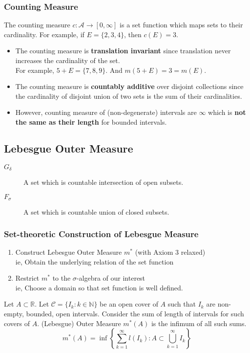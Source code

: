 \subsubsection{Counting Measure}
	The counting measure $c : \mathcal{A} \to [0,\infty]$ is a set function which maps sets to their cardinality.
	For example, if $E = \{2,3,4\}$, then $c(E) = 3$.
\begin{itemize}
	\item The counting measure is \textbf{translation invariant} since translation never increases the cardinality of the set.\\
	For example, $5+E = \{7,8,9\}$.
	And $m(5+E) = 3 = m(E)$.
	\item The counting measure is \textbf{countably additive} over disjoint collections since the cardinality of disjoint union of two sets is the sum of their cardinalities.
	\item However, counting measure of (non-degenerate) intervals are $\infty$ which is \textbf{not the same as their length} for bounded intervals.
\end{itemize}

\subsection{Lebesgue Outer Measure}
\begin{description}
	\item[$G_\delta$] A set which is countable intersection of open subsets.
	\item[$F_\sigma$] A set which is countable union of closed subsets.
\end{description}

\subsubsection{Set-theoretic Construction of Lebesgue Measure}
\begin{enumerate}
	\item Construct Lebesgue Outer Measure $m^\ast$ (with Axiom 3 relaxed) \\
		ie, Obtain the underlying relation of the set function
	\item Restrict $m^\ast$ to the $\sigma$-algebra of our interest \\
		ie, Choose a domain so that set function is well defined.
\end{enumerate}
\begin{definition}
	Let $A \subset \mathbb{R}$.
	Let $\mathcal{C} = \{ I_k : k \in \mathbb{N}\}$ be an open cover of $A$ such that $I_k$ are non-empty, bounded, open intervals.
	Consider the sum of length of intervals for such covers of $A$.
	(Lebesgue) Outer Measure $m^\ast(A)$ is the infimum of all such sums.
\begin{equation}
	 m^\ast(A) = \inf \left\{ \sum_{k=1}^\infty l(I_k) : A \subset \bigcup_{k=1}^\infty I_k \right\} 
	 \label{eq:outermeasure}
\end{equation}
\end{definition}
